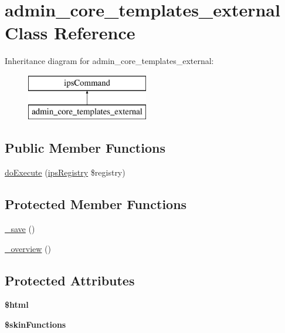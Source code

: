 \hypertarget{classadmin__core__templates__external}{\section{admin\-\_\-core\-\_\-templates\-\_\-external Class Reference}
\label{classadmin__core__templates__external}
}
Inheritance diagram for admin\-\_\-core\-\_\-templates\-\_\-external\-:\begin{figure}[H]
\begin{center}
\leavevmode
\includegraphics[height=2.000000cm]{classadmin__core__templates__external}
\end{center}
\end{figure}
\subsection*{Public Member Functions}
\begin{DoxyCompactItemize}
\item 
\hyperlink{classadmin__core__templates__external_afbc4e912a0604b94d47d66744c64d8ba}{do\-Execute} (\hyperlink{classips_registry}{ips\-Registry} \$registry)
\end{DoxyCompactItemize}
\subsection*{Protected Member Functions}
\begin{DoxyCompactItemize}
\item 
\hyperlink{classadmin__core__templates__external_aa7bd244ff7a03dcca9284d1c8711a46e}{\-\_\-save} ()
\item 
\hyperlink{classadmin__core__templates__external_aabb6d8c41c4bc9b71b454491bc1f8db7}{\-\_\-overview} ()
\end{DoxyCompactItemize}
\subsection*{Protected Attributes}
\begin{DoxyCompactItemize}
\item 
\hypertarget{classadmin__core__templates__external_a6f96e7fc92441776c9d1cd3386663b40}{{\bfseries \$html}}\label{classadmin__core__templates__external_a6f96e7fc92441776c9d1cd3386663b40}

\item 
\hypertarget{classadmin__core__templates__external_a41d90687021c6f16184b43666509dee8}{{\bfseries \$skin\-Functions}}\label{classadmin__core__templates__external_a41d90687021c6f16184b43666509dee8}

\end{DoxyCompactItemize}

